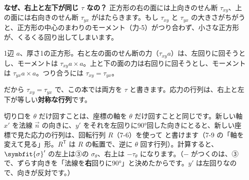 \noindent\textbf{なぜ、右上と左下が同じ $\tau$ なの？}\quad
正方形の右の面には上向きのせん断 $\tau_{xy}$、上の面には右向きのせん断 $\tau_{yx}$ がはたらきます。もし $\tau_{xy}$ と $\tau_{yx}$ の大きさがちがうと、正方形の中心のまわりのモーメント（力-5）がつり合わず、小さな正方形が、くるくる回り出してしまいます。
\begin{bkfigure}
\noindent\begin{minipage}[c]{0.40\linewidth}\centering
{}
\end{minipage}\hfill
\begin{minipage}[c]{0.56\linewidth}\raggedright\small
1辺 $a$、厚さ1の正方形。右と左の面のせん断の力（$\tau_{xy}a$）は、左回りに回そうとし、モーメントは $\tau_{xy}a\times a$。上と下の面の力は右回りに回そうとし、モーメントは $\tau_{yx}a\times a$。つり合うには $\tau_{xy}=\tau_{yx}$。
\end{minipage}
\label{ph:力-9:fig-pair}
\end{bkfigure}
だから $\tau_{xy}=\tau_{yx}$ で、この本では両方を $\tau$ と書きます。応力の行列は、右上と左下が等しい\textbf{対称な行列}です。

\leavevmode\label{ph:力-9:sec6}切り口を $\theta$ だけ回すことは、座標の軸を $\theta$ だけ回すことと同じです。新しい軸 $x'$ を法線 $\vec n$ の向きに、$y'$ をそれを左回りに90°回した向きにとると、新しい座標で見た応力の行列は、回転行列 $R$（7-6）を使って
と書けます（7-9 の「軸を変えて見る」形。$R^{\mathsf T}$ は $R$ の転置で、逆に $\theta$ 回す行列）。計算すると、$\symbfit{\sigma}'$ の左上は③の $\sigma_\theta$、右上は $-\tau_\theta$ になります。（$-$ がつくのは、③で、ずらす向きを「法線を\textbf{右}回りに90°」と決めたからです。$y'$ は左回りなので、向きが反対です。）

